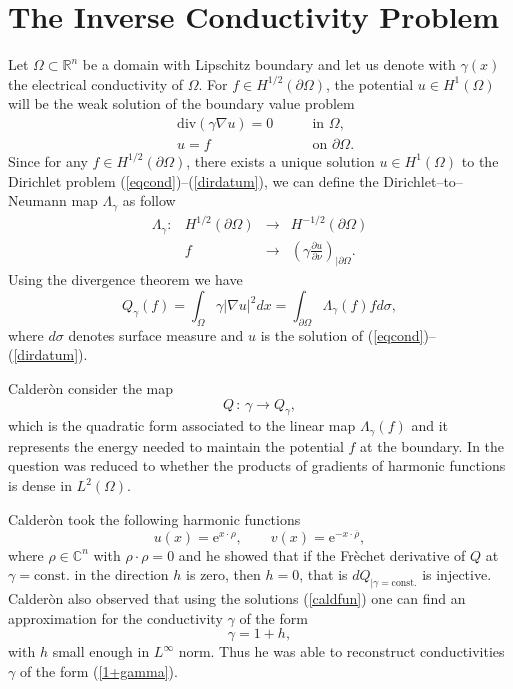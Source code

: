 \documentclass[10pt, a4paper, twoside, openright]{book}
\theoremstyle{definition}
\theoremstyle{plain}
\theoremstyle{plain}
\theoremstyle{plain}
\theoremstyle{plain}
\theoremstyle{plain}
\theoremstyle{plain}
\theoremstyle{plain}
\theoremstyle{plain}
\begin{document}
\section{The Inverse Conductivity Problem}
\label{globuniq}
Let $\Omega\subset\mathbb{R}^{n}$ be a domain with Lipschitz boundary and let
us denote with $\gamma(x)$ the electrical conductivity of $\Omega$.
For $f\in H^{1/2}(\partial\Omega)$,
the potential $u\in H^{1}(\Omega)$ will be the weak
solution of the boundary value problem
\begin{eqnarray}
\label{eqcond}
&\mathrm{div}(\gamma\nabla u)=0\qquad&\textrm{in }\Omega,\\
\label{dirdatum}
&u=f\qquad&\textrm{on }\partial\Omega.
\end{eqnarray}
Since for any $f\in H^{1/2}(\partial\Omega)$, there exists a unique solution $u\in H^{1}(\Omega)$
to the Dirichlet problem (\ref{eqcond})--(\ref{dirdatum}),
we can define the Dirichlet--to--Neumann map $\Lambda_{\gamma}$ as follow
\begin{equation}
\label{dirtoneum}
\begin{array}{cccc}
\Lambda_{\gamma}:&H^{1/2}(\partial\Omega)&\longrightarrow&H^{-1/2}(\partial\Omega)\\
&f&\longrightarrow&\left(\gamma\frac{\partial u}{\partial\nu}\right)_{|\partial\Omega}.
\end{array}
\end{equation}
Using the divergence theorem we have
\begin{equation}
\label{Qmap}
Q_{\gamma}(f)=\int_{\Omega}\gamma|\nabla u|^{2}dx
=\int_{\partial\Omega}\Lambda_\gamma(f)fd\sigma,
\end{equation}
where $d\sigma$ denotes surface measure and $u$ is the solution
of (\ref{eqcond})--(\ref{dirdatum}).

Calder\`on consider the map
\begin{equation}
\label{Q}
Q\,:\,\gamma\longrightarrow Q_{\gamma},
\end{equation}
which is the quadratic form associated to the linear map
$\Lambda_{\gamma}(f)$ and it represents
the energy needed to maintain the potential
$f$ at the boundary.
In \cite{Ca} the question was reduced to whether the products of gradients
of harmonic functions is dense in $L^{2}(\Omega)$.

Calder\`on
took the following harmonic functions
\begin{equation}
\label{caldfun}
u(x)=\mathrm{e}^{x\cdot\rho},\qquad v(x)=\mathrm{e}^{-x\cdot\overline{\rho}},
\end{equation}
where $\rho\in\mathbb{C}^{n}$ with $\rho\cdot\rho=0$ and he
showed that if the Fr\`echet derivative of $Q$
at $\gamma=\mathrm{const.}$ in the direction $h$ is zero,
then $h=0$, that is $dQ_{|\gamma=\mathrm{const.}}$ is injective.
Calder\`on also observed that using the solutions (\ref{caldfun})
one can find an approximation for the conductivity $\gamma$ of the form
\begin{equation}
\label{1+gamma}
\gamma=1+h,
\end{equation}
with $h$ small enough in $L^{\infty}$ norm.
Thus he was able to reconstruct conductivities $\gamma$ of the form (\ref{1+gamma}).
\end{document}
